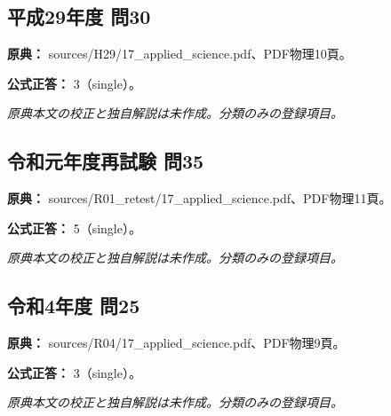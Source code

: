\subsection{平成29年度 問30}
\label{q:h29-reg-applied-30}

\noindent\textbf{原典：} sources/H29/17\_applied\_science.pdf、PDF物理10頁。

\textbf{公式正答：} 3（single）。

\par\textit{原典本文の校正と独自解説は未作成。分類のみの登録項目。}

\subsection{令和元年度再試験 問35}
\label{q:r01-ret-applied-35}

\noindent\textbf{原典：} sources/R01\_retest/17\_applied\_science.pdf、PDF物理11頁。

\textbf{公式正答：} 5（single）。

\par\textit{原典本文の校正と独自解説は未作成。分類のみの登録項目。}

\subsection{令和4年度 問25}
\label{q:r04-reg-applied-25}

\noindent\textbf{原典：} sources/R04/17\_applied\_science.pdf、PDF物理9頁。

\textbf{公式正答：} 3（single）。

\par\textit{原典本文の校正と独自解説は未作成。分類のみの登録項目。}
